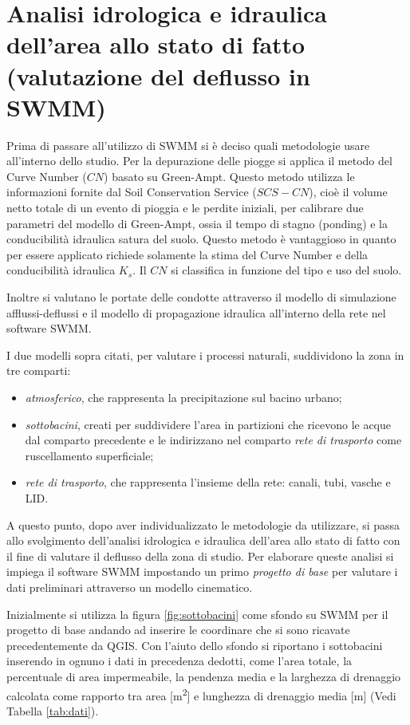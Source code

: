 \chapter{Analisi idrologica e idraulica dell’area allo stato di fatto (valutazione del deflusso in SWMM)}\label{cap:progettoBase}
Prima di passare all'utilizzo di SWMM si è deciso quali metodologie usare all'interno dello studio.
Per la depurazione delle piogge si applica il metodo del Curve Number ($CN$) basato su Green-Ampt. 
Questo metodo utilizza le informazioni fornite dal Soil Conservation Service ($SCS-CN$), cioè il volume netto totale di un evento di pioggia e le perdite iniziali, per calibrare due parametri del modello di Green-Ampt, ossia il tempo di stagno (ponding) e la conducibilità idraulica satura del suolo.
Questo metodo è vantaggioso in quanto per essere applicato richiede solamente la stima del Curve Number e della conducibilità idraulica $K_s$. 
Il $CN$ si classifica in funzione del tipo e uso del suolo. 

Inoltre si valutano le portate delle condotte attraverso il modello di simulazione afflussi-deflussi e il modello di propagazione idraulica all'interno della rete nel software SWMM.

I due modelli sopra citati, per valutare i processi naturali, suddividono la zona in tre comparti:
\begin{itemize}
\item \emph{atmosferico}, che rappresenta la precipitazione sul bacino urbano;
\item \emph{sottobacini}, creati per suddividere l'area in partizioni che ricevono le acque dal comparto precedente e le indirizzano nel comparto \emph{rete di trasporto} come ruscellamento superficiale;
\item \emph{rete di trasporto}, che rappresenta l'insieme della rete: canali, tubi, vasche e LID.
\end{itemize}
A questo punto, dopo aver individualizzato le metodologie da utilizzare, si passa allo svolgimento dell'analisi idrologica e idraulica dell'area allo stato di fatto con il fine di valutare il deflusso della zona di studio.
Per elaborare queste analisi si impiega il software SWMM impostando un primo \emph{progetto di base} per valutare i dati preliminari attraverso un modello cinematico.

Inizialmente si utilizza la figura \ref{fig:sottobacini} come sfondo su SWMM per il progetto di base andando ad inserire le coordinare che si sono ricavate precedentemente da QGIS.
Con l'aiuto dello sfondo si riportano i sottobacini inserendo in ognuno i dati in precedenza dedotti, come l'area totale, la percentuale di area impermeabile, la pendenza media e la larghezza di drenaggio calcolata come rapporto tra area [\si{\square\metre}] e lunghezza di drenaggio media [\si{\metre}] (Vedi Tabella \ref{tab:dati}).

